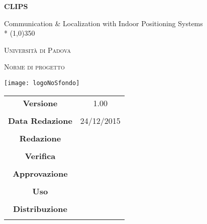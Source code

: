 \documentclass[a4paper,12pt]{article}
\author{Oscar Elia Conti, Marco Zanella}
\date{24/12/2015}
\begin{document}
\begin{titlepage}
	\centering
	{\huge\bfseries CLIPS\par}
	Communication \& Localization with Indoor Positioning Systems \\*
	\line(1,0){350} \\
	{\scshape\LARGE Università di Padova \par}
	\vspace{1cm}
	{\scshape\Large Norme di progetto\par}
	\vspace{2cm}
	\begin{center}
	{\texttt{[image: logoNoSfondo]} \par}
	\end{center}
	\vfill \vfill
	\begin{tabular}{c|c}
		{\hfill \textbf{Versione}} 			& 1.00				\\ \\
		{\hfill\textbf{Data Redazione}} 		& 24/12/2015  		\\ \\
		{\hfill\textbf{Redazione}} 			&  \\ \\
		{\hfill\textbf{Verifica}} 				&  \\ \\
		{\hfill\textbf{Approvazione}} 		&  \\ \\
		{\hfill\textbf{Uso}} 					& \\ \\
		{\hfill\textbf{Distribuzione}} 			& \\ \\
	\end{tabular}
\end{titlepage}
	
	\newpage

	\tableofcontents
	
	\label{LastFrontPage}
	
		

	\newpage
	
	\pagestyle{mymain}
	
	\newpage
		

	\newpage
		
	
	\newpage
		
	
	\newpage
		
		
	\label{LastPage}
\end{document}
